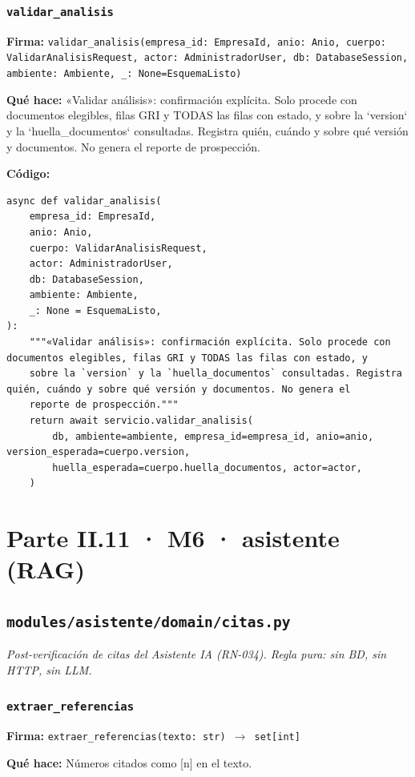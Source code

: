 \documentclass[11pt,a4paper]{article}
\begin{document}
\subsubsection*{\texttt{validar\_analisis}}
\textbf{Firma:} \texttt{validar\_analisis(empresa\_id: EmpresaId, anio: Anio, cuerpo: ValidarAnalisisRequest, actor: AdministradorUser, db: DatabaseSession, ambiente: Ambiente, \_: None=EsquemaListo)}

\textbf{Qué hace:} «Validar análisis»: confirmación explícita. Solo procede con documentos elegibles, filas GRI y TODAS las filas con estado, y
sobre la `version` y la `huella\_documentos` consultadas. Registra quién, cuándo y sobre qué versión y documentos. No genera el
reporte de prospección.

\textbf{Código:}
\begin{lstlisting}
async def validar_analisis(
    empresa_id: EmpresaId,
    anio: Anio,
    cuerpo: ValidarAnalisisRequest,
    actor: AdministradorUser,
    db: DatabaseSession,
    ambiente: Ambiente,
    _: None = EsquemaListo,
):
    """«Validar análisis»: confirmación explícita. Solo procede con documentos elegibles, filas GRI y TODAS las filas con estado, y
    sobre la `version` y la `huella_documentos` consultadas. Registra quién, cuándo y sobre qué versión y documentos. No genera el
    reporte de prospección."""
    return await servicio.validar_analisis(
        db, ambiente=ambiente, empresa_id=empresa_id, anio=anio, version_esperada=cuerpo.version,
        huella_esperada=cuerpo.huella_documentos, actor=actor,
    )
\end{lstlisting}

\section{Parte II.11 · M6 · asistente (RAG)}
\subsection{\texttt{modules/asistente/domain/citas.py}}
\textit{Post-verificación de citas del Asistente IA (RN-034). Regla pura: sin BD, sin HTTP, sin LLM.}

\subsubsection*{\texttt{extraer\_referencias}}
\textbf{Firma:} \texttt{extraer\_referencias(texto: str) $\rightarrow$ set[int]}

\textbf{Qué hace:} Números citados como [n] en el texto.
\end{document}
